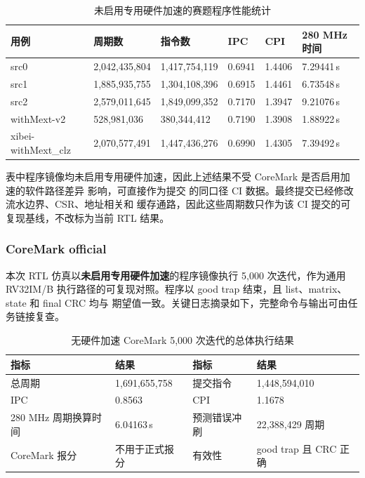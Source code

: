 \begin{table}[H]\centering
\caption{未启用专用硬件加速的赛题程序性能统计}
\scriptsize
\begin{tabularx}{\linewidth}{@{}lYYYYY@{}}\toprule
\textbf{用例}&\textbf{周期数}&\textbf{指令数}&\textbf{IPC}&\textbf{CPI}&\textbf{280 MHz 时间}\\\midrule
src0&2,042,435,804&1,417,754,119&0.6941&1.4406&7.29441\,s\\
src1&1,885,935,755&1,304,108,396&0.6915&1.4461&6.73548\,s\\
src2&2,579,011,645&1,849,099,352&0.7170&1.3947&9.21076\,s\\
withMext-v2&528,981,036&380,344,412&0.7190&1.3908&1.88922\,s\\
xibei-withMext\_clz&2,070,577,491&1,447,436,276&0.6990&1.4305&7.39492\,s\\
\bottomrule\end{tabularx}
\end{table}

表中程序镜像均未启用专用硬件加速，因此上述结果不受 CoreMark 是否启用加速的软件路径差异
影响，可直接作为提交  的同口径 CI 数据。最终提交已经修改流水边界、CSR、地址相关和
缓存通路，因此这些周期数只作为该 CI 提交的可复现基线，不改标为当前 RTL 结果。

\subsubsection{CoreMark official}

本次 RTL 仿真以\textbf{未启用专用硬件加速}的程序镜像执行 5,000 次迭代，作为通用
RV32IM/B 执行路径的可复现对照。程序以 good trap 结束，且 list、matrix、state 和 final CRC 均与
期望值一致。关键日志摘录如下，完整命令与输出可由任务链接复查。

\begin{center}
\end{center}

\begin{table}[H]\centering
\caption{无硬件加速 CoreMark 5,000 次迭代的总体执行结果}
\small
\begin{tabularx}{\linewidth}{@{}lYlY@{}}\toprule
\textbf{指标}&\textbf{结果}&\textbf{指标}&\textbf{结果}\\\midrule
总周期&1,691,655,758&提交指令&1,448,594,010\\
IPC&0.8563&CPI&1.1678\\
280 MHz 周期换算时间&6.04163\,s&预测错误冲刷&22,388,429 周期\\
CoreMark 报分&不用于正式报分&有效性&good trap 且 CRC 正确\\
\bottomrule\end{tabularx}
\end{table}

